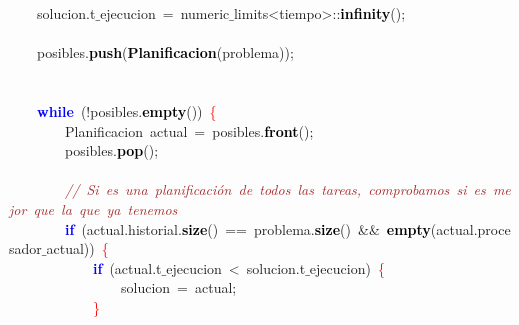 \mbox{}\ \ \ \ solucion\textcolor{BrickRed}{.}t$\_$ejecucion\ \textcolor{BrickRed}{=}\ numeric$\_$limits\textcolor{BrickRed}{\textless{}}tiempo\textcolor{BrickRed}{\textgreater{}::}\textbf{\textcolor{Black}{infinity}}\textcolor{BrickRed}{();} \\
\mbox{} \\
\mbox{}\ \ \ \ posibles\textcolor{BrickRed}{.}\textbf{\textcolor{Black}{push}}\textcolor{BrickRed}{(}\textbf{\textcolor{Black}{Planificacion}}\textcolor{BrickRed}{(}problema\textcolor{BrickRed}{));} \\
\mbox{} \\
\mbox{} \\
\mbox{}\ \ \ \ \textbf{\textcolor{Blue}{while}}\ \textcolor{BrickRed}{(!}posibles\textcolor{BrickRed}{.}\textbf{\textcolor{Black}{empty}}\textcolor{BrickRed}{())}\ \textcolor{Red}{\{} \\
\mbox{}\ \ \ \ \ \ \ \ \textcolor{TealBlue}{Planificacion}\ actual\ \textcolor{BrickRed}{=}\ posibles\textcolor{BrickRed}{.}\textbf{\textcolor{Black}{front}}\textcolor{BrickRed}{();} \\
\mbox{}\ \ \ \ \ \ \ \ posibles\textcolor{BrickRed}{.}\textbf{\textcolor{Black}{pop}}\textcolor{BrickRed}{();} \\
\mbox{} \\
\mbox{}\ \ \ \ \ \ \ \ \textit{\textcolor{Brown}{//\ Si\ es\ una\ planificación\ de\ todos\ las\ tareas,\ comprobamos\ si\ es\ mejor\ que\ la\ que\ ya\ tenemos}} \\
\mbox{}\ \ \ \ \ \ \ \ \textbf{\textcolor{Blue}{if}}\ \textcolor{BrickRed}{(}actual\textcolor{BrickRed}{.}historial\textcolor{BrickRed}{.}\textbf{\textcolor{Black}{size}}\textcolor{BrickRed}{()}\ \textcolor{BrickRed}{==}\ problema\textcolor{BrickRed}{.}\textbf{\textcolor{Black}{size}}\textcolor{BrickRed}{()}\ \textcolor{BrickRed}{\&\&}\ \textbf{\textcolor{Black}{empty}}\textcolor{BrickRed}{(}actual\textcolor{BrickRed}{.}procesador$\_$actual\textcolor{BrickRed}{))}\ \textcolor{Red}{\{} \\
\mbox{}\ \ \ \ \ \ \ \ \ \ \ \ \textbf{\textcolor{Blue}{if}}\ \textcolor{BrickRed}{(}actual\textcolor{BrickRed}{.}t$\_$ejecucion\ \textcolor{BrickRed}{\textless{}}\ solucion\textcolor{BrickRed}{.}t$\_$ejecucion\textcolor{BrickRed}{)}\ \textcolor{Red}{\{} \\
\mbox{}\ \ \ \ \ \ \ \ \ \ \ \ \ \ \ \ solucion\ \textcolor{BrickRed}{=}\ actual\textcolor{BrickRed}{;} \\
\mbox{}\ \ \ \ \ \ \ \ \ \ \ \ \textcolor{Red}{\}} \\
